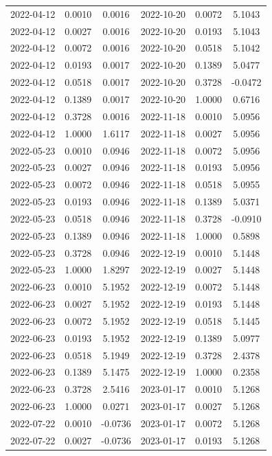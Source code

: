 \begin{footnotesize}
\begin{longtable}{lcc|lcc}
2022-04-12 & 0.0010 & 0.0016 & 2022-10-20 & 0.0072 & 5.1043 \\
2022-04-12 & 0.0027 & 0.0016 & 2022-10-20 & 0.0193 & 5.1043 \\
2022-04-12 & 0.0072 & 0.0016 & 2022-10-20 & 0.0518 & 5.1042 \\
2022-04-12 & 0.0193 & 0.0017 & 2022-10-20 & 0.1389 & 5.0477 \\
2022-04-12 & 0.0518 & 0.0017 & 2022-10-20 & 0.3728 & -0.0472 \\
2022-04-12 & 0.1389 & 0.0017 & 2022-10-20 & 1.0000 & 0.6716 \\
2022-04-12 & 0.3728 & 0.0016 & 2022-11-18 & 0.0010 & 5.0956 \\
2022-04-12 & 1.0000 & 1.6117 & 2022-11-18 & 0.0027 & 5.0956 \\
2022-05-23 & 0.0010 & 0.0946 & 2022-11-18 & 0.0072 & 5.0956 \\
2022-05-23 & 0.0027 & 0.0946 & 2022-11-18 & 0.0193 & 5.0956 \\
2022-05-23 & 0.0072 & 0.0946 & 2022-11-18 & 0.0518 & 5.0955 \\
2022-05-23 & 0.0193 & 0.0946 & 2022-11-18 & 0.1389 & 5.0371 \\
2022-05-23 & 0.0518 & 0.0946 & 2022-11-18 & 0.3728 & -0.0910 \\
2022-05-23 & 0.1389 & 0.0946 & 2022-11-18 & 1.0000 & 0.5898 \\
2022-05-23 & 0.3728 & 0.0946 & 2022-12-19 & 0.0010 & 5.1448 \\
2022-05-23 & 1.0000 & 1.8297 & 2022-12-19 & 0.0027 & 5.1448 \\
2022-06-23 & 0.0010 & 5.1952 & 2022-12-19 & 0.0072 & 5.1448 \\
2022-06-23 & 0.0027 & 5.1952 & 2022-12-19 & 0.0193 & 5.1448 \\
2022-06-23 & 0.0072 & 5.1952 & 2022-12-19 & 0.0518 & 5.1445 \\
2022-06-23 & 0.0193 & 5.1952 & 2022-12-19 & 0.1389 & 5.0977 \\
2022-06-23 & 0.0518 & 5.1949 & 2022-12-19 & 0.3728 & 2.4378 \\
2022-06-23 & 0.1389 & 5.1475 & 2022-12-19 & 1.0000 & 0.2358 \\
2022-06-23 & 0.3728 & 2.5416 & 2023-01-17 & 0.0010 & 5.1268 \\
2022-06-23 & 1.0000 & 0.0271 & 2023-01-17 & 0.0027 & 5.1268 \\
2022-07-22 & 0.0010 & -0.0736 & 2023-01-17 & 0.0072 & 5.1268 \\
2022-07-22 & 0.0027 & -0.0736 & 2023-01-17 & 0.0193 & 5.1268 \\

\end{longtable}
\end{footnotesize}
